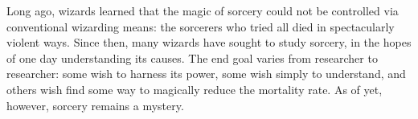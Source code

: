 \begin{multicols}{2}
Long ago, wizards learned that the magic of sorcery could not be controlled via conventional wizarding means: the sorcerers who tried all died in spectacularly violent ways.
Since then, many wizards have sought to study sorcery, in the hopes of one day understanding its causes.
The end goal varies from researcher to researcher: some wish to harness its power, some wish simply to understand, and others wish find some way to magically reduce the mortality rate.
As of yet, however, sorcery remains a mystery.


\end{multicols}